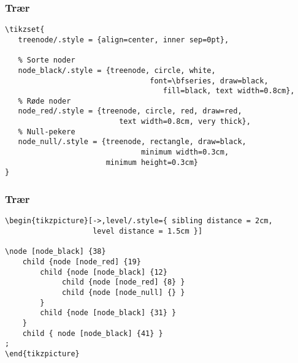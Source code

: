 \documentclass{beamer}
\begin{document}
\begin{frame}[fragile]
\frametitle{Trær}

\begin{Verbatim}[fontsize=\footnotesize, frame=single]
\tikzset{
   treenode/.style = {align=center, inner sep=0pt},
	
   % Sorte noder
   node_black/.style = {treenode, circle, white, 
		                  	     font=\bfseries, draw=black,
			                        fill=black, text width=0.8cm},
   % Røde noder
   node_red/.style = {treenode, circle, red, draw=red, 
	                      text width=0.8cm, very thick},
   % Null-pekere
   node_null/.style = {treenode, rectangle, draw=black, 
		                       minimum width=0.3cm, 
                       minimum height=0.3cm}
}
\end{Verbatim}

\end{frame}


\begin{frame}[fragile]
\frametitle{Trær}

\begin{Verbatim}[fontsize=\footnotesize, frame=single]
\begin{tikzpicture}[->,level/.style={ sibling distance = 2cm, 
                    level distance = 1.5cm }] 

\node [node_black] {38}
    child {node [node_red] {19} 
        child {node [node_black] {12}
             child {node [node_red] {8} }
             child {node [node_null] {} }
        }
        child {node [node_black] {31} }
    }
    child { node [node_black] {41} }
; 
\end{tikzpicture}
\end{Verbatim}

\end{frame}
\end{document}
